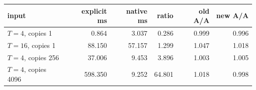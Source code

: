 \begin{center}
\begin{tabular}{lrrrrr}
\toprule
input & explicit ms & native ms & ratio & old A/A & new A/A\\
\midrule
$T=4$, copies 1 & 0.864 & 3.037 & 0.286 & 0.999 & 0.996\\
$T=16$, copies 1 & 88.150 & 57.157 & 1.299 & 1.047 & 1.018\\
$T=4$, copies 256 & 37.006 & 9.453 & 3.896 & 1.003 & 1.005\\
$T=4$, copies 4096 & 598.350 & 9.252 & 64.801 & 1.018 & 0.998\\
\bottomrule
\end{tabular}
\end{center}
